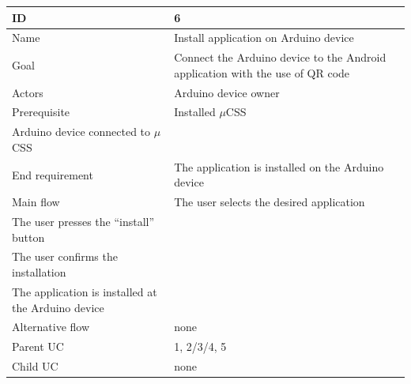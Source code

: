 \begin{table}
    \begin{tabular}{|l|l|}
        \hline
        ID               & 6                                                                                                                                                                                    \\ \hline
        Name             & Install application on Arduino device                                                                                                                                                \\ 
        Goal             & Connect the Arduino device to the Android application with the use of QR code                                                                                                        \\ 
        Actors           & Arduino device owner                                                                                                                                                                 \\ 
        Prerequisite     &     Installed $\mu$CSS \\     Arduino device connected to $\mu$CSS                                                                                                                   \\ 
        End requirement  & The application is installed on the Arduino device                                                                                                                                   \\ 
        Main flow        &     The user selects the desired application \\     The user presses the “install” button \\     The user confirms the installation \\     The application is installed at the Arduino device \\ 
        Alternative flow & none                                                                                                                                                                                 \\ 
        Parent UC        & 1, 2/3/4, 5                                                                                                                                                                          \\ 
        Child UC         & none                                                                                                                                                                                 \\
        \hline
    \end{tabular}
\end{table}


